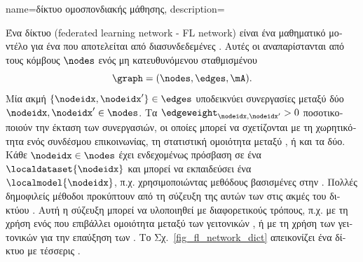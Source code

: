 {name={\foreignlanguage{greek}{δίκτυο ομοσπονδιακής μάθησης}},
	description={\foreignlanguage{greek}{Ένα δίκτυο}  
		(federated learning network - FL network) \foreignlanguage{greek}{είναι ένα μαθηματικό μοντέλο για ένα}  
		\foreignlanguage{greek}{που αποτελείται από διασυνδεδεμένες} . \foreignlanguage{greek}{Αυτές οι} 
		 \foreignlanguage{greek}{αναπαρίστανται από τους κόμβους $\nodes$ ενός μη κατευθυνόμενου 
		σταθμισμένου} 
		\[
			\graph = (\nodes,\edges,\mA).
		\]
		\foreignlanguage{greek}{Μία ακμή $\{\nodeidx,\nodeidx'\} \in \edges$ υποδεικνύει συνεργασίες μεταξύ δύο}  
		$\nodeidx, \nodeidx' \in \nodes$. \foreignlanguage{greek}{Τα}  $\edgeweight_{\nodeidx,\nodeidx'} > 0$ 
		\foreignlanguage{greek}{ποσοτικοποιούν την έκταση των συνεργασιών, οι οποίες μπορεί να σχετίζονται με τη χωρητικότητα 
		ενός συνδέσμου επικοινωνίας, τη στατιστική ομοιότητα μεταξύ} , \foreignlanguage{greek}{ή και τα δύο. 
		Κάθε}  $\nodeidx \in \nodes$ \foreignlanguage{greek}{έχει ενδεχομένως πρόσβαση σε ένα}
		 $\localdataset{\nodeidx}$ \foreignlanguage{greek}{και μπορεί να εκπαιδεύσει ένα}  
		$\localmodel{\nodeidx}$, \foreignlanguage{greek}{π.χ. χρησιμοποιώντας μεθόδους βασισμένες στην} . 
		\foreignlanguage{greek}{Πολλές δημοφιλείς μέθοδοι}  \foreignlanguage{greek}{προκύπτουν από τη σύζευξη της} 
		 \foreignlanguage{greek}{αυτών των}  \foreignlanguage{greek}{στις ακμές 
		του δικτύου}  \cite{JungFLBook}. \foreignlanguage{greek}{Αυτή η σύζευξη μπορεί να υλοποιηθεί με διαφορετικούς 
		τρόπους, π.χ. με τη χρήση ενός}  \foreignlanguage{greek}{που επιβάλλει ομοιότητα μεταξύ των} 
		 \foreignlanguage{greek}{γειτονικών} , \foreignlanguage{greek}{ή με τη χρήση των} 
		 \foreignlanguage{greek}{γειτονικών}  \foreignlanguage{greek}{για την επαύξηση των} 
		. \foreignlanguage{greek}{Το Σχ.}\ \ref{fig_fl_network_dict} \foreignlanguage{greek}{απεικονίζει ένα δίκτυο} 
		 \foreignlanguage{greek}{με τέσσερις} .
		\begin{figure}[H]

\end{figure}}}
